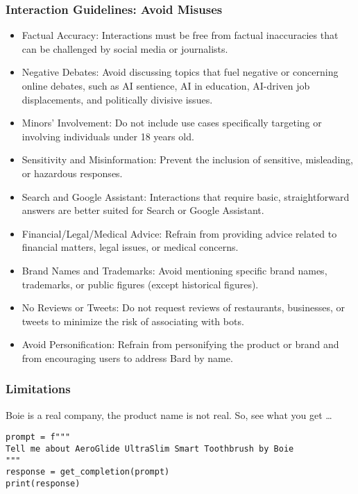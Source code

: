 \begin{frame}[fragile]\frametitle{Interaction Guidelines: Avoid Misuses}

\begin{itemize}
\item Factual Accuracy: Interactions must be free from factual inaccuracies that can be challenged by social media or journalists.
\item Negative Debates: Avoid discussing topics that fuel negative or concerning online debates, such as AI sentience, AI in education, AI-driven job displacements, and politically divisive issues.
\item Minors' Involvement: Do not include use cases specifically targeting or involving individuals under 18 years old.
\item Sensitivity and Misinformation: Prevent the inclusion of sensitive, misleading, or hazardous responses.
\item Search and Google Assistant: Interactions that require basic, straightforward answers are better suited for Search or Google Assistant.
\item Financial/Legal/Medical Advice: Refrain from providing advice related to financial matters, legal issues, or medical concerns.
\item Brand Names and Trademarks: Avoid mentioning specific brand names, trademarks, or public figures (except historical figures).
\item No Reviews or Tweets: Do not request reviews of restaurants, businesses, or tweets to minimize the risk of associating with bots.
\item Avoid Personification: Refrain from personifying the product or brand and from encouraging users to address Bard by name.
\end{itemize}	 
\end{frame}


\begin{frame}[fragile]\frametitle{Limitations}


Boie is a real company, the product name is not real. So, see what you get \ldots

\begin{lstlisting}
prompt = f"""
Tell me about AeroGlide UltraSlim Smart Toothbrush by Boie
"""
response = get_completion(prompt)
print(response)
\end{lstlisting}	 
		
\end{frame}

